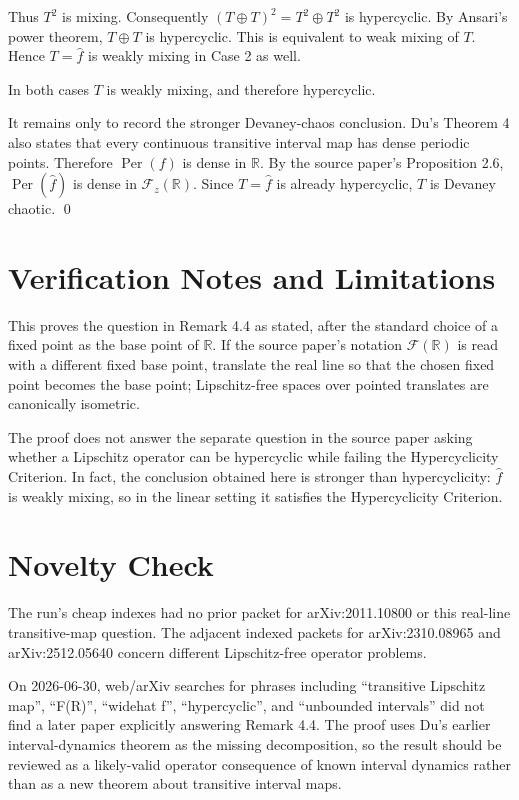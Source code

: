 \documentclass[11pt]{article}
\newcommand{\F}{\mathcal F}
\newcommand{\R}{\mathbb R}
\newcommand{\1}{\mathbf 1}
\newcommand{\Per}{\operatorname{Per}}
\begin{document}
Thus \(T^2\) is mixing.  Consequently \((T\oplus T)^2=T^2\oplus T^2\) is
hypercyclic.  By Ansari's power theorem, \(T\oplus T\) is hypercyclic.  This
is equivalent to weak mixing of \(T\).  Hence \(T=\widehat f\) is weakly
mixing in Case 2 as well.

\medskip
In both cases \(T\) is weakly mixing, and therefore hypercyclic.

It remains only to record the stronger Devaney-chaos conclusion.  Du's
Theorem 4 also states that every continuous transitive interval map has dense
periodic points.  Therefore \(\Per(f)\) is dense in \(\R\).  By the source
paper's Proposition 2.6, \(\Per(\widehat f)\) is dense in \(\F_z(\R)\).
Since \(T=\widehat f\) is already hypercyclic, \(T\) is Devaney chaotic.
\qed

\section*{Verification Notes and Limitations}

This proves the question in Remark 4.4 as stated, after the standard choice of
a fixed point as the base point of \(\R\).  If the source paper's notation
\(\F(\R)\) is read with a different fixed base point, translate the real line
so that the chosen fixed point becomes the base point; Lipschitz-free spaces
over pointed translates are canonically isometric.

The proof does not answer the separate question in the source paper asking
whether a Lipschitz operator can be hypercyclic while failing the
Hypercyclicity Criterion.  In fact, the conclusion obtained here is stronger
than hypercyclicity: \(\widehat f\) is weakly mixing, so in the linear setting
it satisfies the Hypercyclicity Criterion.

\section*{Novelty Check}

The run's cheap indexes had no prior packet for arXiv:2011.10800 or this
real-line transitive-map question.  The adjacent indexed packets for
arXiv:2310.08965 and arXiv:2512.05640 concern different Lipschitz-free
operator problems.

On 2026-06-30, web/arXiv searches for phrases including
``transitive Lipschitz map'', ``F(R)'', ``widehat f'', ``hypercyclic'', and
``unbounded intervals'' did not find a later paper explicitly answering
Remark 4.4.  The proof uses Du's earlier interval-dynamics theorem as the
missing decomposition, so the result should be reviewed as a likely-valid
operator consequence of known interval dynamics rather than as a new theorem
about transitive interval maps.
\end{document}
